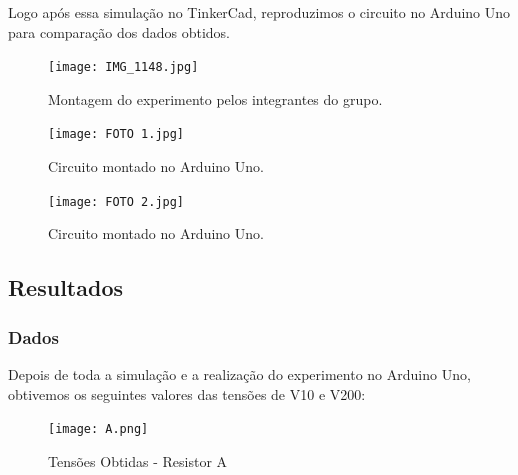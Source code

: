 \documentclass[a4paper,12pt]{article}
\begin{document}
\vspace{1em}

Logo após essa simulação no TinkerCad, reproduzimos o circuito no Arduino Uno para comparação dos dados obtidos.

\vspace{1em}

\begin{figure}[H]
    \centering
    \texttt{[image: IMG\_1148.jpg]} %
    \caption{Montagem do experimento pelos integrantes do grupo.}
    \label{fig:arduino}
\end{figure}

\vspace{1em}
\begin{figure}[H]
    \centering
    \texttt{[image: FOTO 1.jpg]} %
    \caption{Circuito montado no Arduino Uno.}
    \label{fig:arduino}
\end{figure}

\vspace{1em}

\begin{figure}[H]
    \centering
    \texttt{[image: FOTO 2.jpg]} %
    \caption{Circuito montado no Arduino Uno.}
    \label{fig:arduino}
\end{figure}

\vspace{1em}

\subsection{Resultados}
\subsubsection{Dados}
\leavevmode

Depois de toda a simulação e a realização do experimento no Arduino Uno, obtivemos os seguintes valores das tensões de V10 e V200:

\vspace{1em}

\begin{figure}[H]
    \centering
    \texttt{[image: A.png]} %
    \caption{Tensões Obtidas - Resistor A}
    \label{fig:arduino}
\end{figure}

\vspace{1em}
\end{document}

